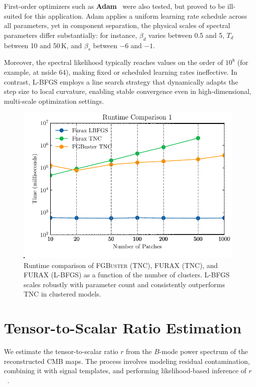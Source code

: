\documentclass[%
 reprint,
bibnotes,
 amsmath,amssymb,
 aps,
floatfix, 
]{revtex4-2}
\begin{document}
First-order optimizers such as \textbf{Adam}~\citep{adam} were also tested, but proved to be ill-suited for this application. Adam applies a uniform learning rate schedule across all parameters, yet in component separation, the physical scales of spectral parameters differ substantially: for instance, \( \beta_d \) varies between 0.5 and 5, \( T_d \) between 10 and 50\,\(\mathrm{K}\), and \( \beta_s \) between \(-6\) and \(-1\).

Moreover, the spectral likelihood typically reaches values on the order of \( 10^8 \) (for example, at nside \( 64 \)), making fixed or scheduled learning rates ineffective. In contrast, L-BFGS employs a line search strategy that dynamically adapts the step size to local curvature, enabling stable convergence even in high-dimensional, multi-scale optimization settings.

\begin{figure}[H]
\centering
\includegraphics[width=0.9\columnwidth]{figures/runtime_comparison.pdf}
\caption{Runtime comparison of \textsc{FGBuster} (TNC), \textsc{FURAX} (TNC), and \textsc{FURAX} (L-BFGS) as a function of the number of clusters. L-BFGS scales robustly with parameter count and consistently outperforms TNC in clustered models. }
\label{fig:runtime_comparison}
\end{figure}

\section{Tensor-to-Scalar Ratio Estimation}
\label{sec:r_estimation}

We estimate the tensor-to-scalar ratio \( r \) from the \( B \)-mode power spectrum of the reconstructed CMB maps. The process involves modeling residual contamination, combining it with signal templates, and performing likelihood-based inference of \( r \)~\citep{STOMPER16, ERRAR18}.
\end{document}

